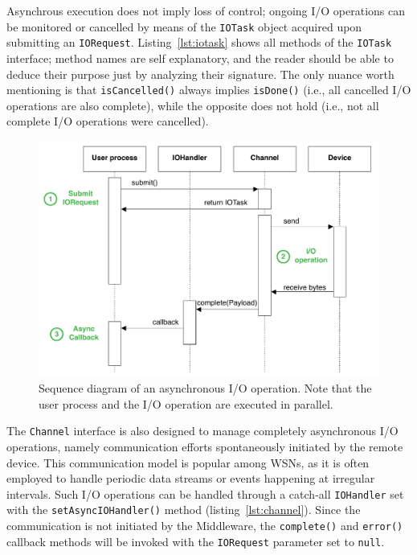 Asynchrous execution does not imply loss of control; ongoing I/O operations can
be monitored or cancelled by means of the \texttt{IOTask} object acquired upon
submitting an \texttt{IORequest}. Listing~\ref{lst:iotask} shows all methods of
the \texttt{IOTask} interface; method names are self explanatory, and the
reader should be able to deduce their purpose just by analyzing their 
signature. The only nuance worth mentioning is that
\texttt{isCancelled()} always implies \texttt{isDone()} (i.e., all cancelled
I/O operations are also complete), while the opposite does not hold (i.e., not
all complete I/O operations were cancelled).

\begin{figure}[!hbt]
\includegraphics[width=\textwidth]{imgs/async_channel_sequence.pdf}
\caption{Sequence diagram of an asynchronous I/O operation. Note that the user
process and the I/O operation are executed in parallel.}
\label{fig:channel.async}
\end{figure}

The \texttt{Channel} interface is also designed to manage completely
asynchronous I/O operations, namely communication efforts spontaneously
initiated by the remote device. This communication model is popular among WSNs,
as it is often employed to handle periodic data streams or events happening
at irregular intervals. Such I/O operations can be handled through a catch-all
\texttt{IOHandler} set with the \texttt{setAsyncIOHandler()} method
(listing~\ref{lst:channel}). Since the communication is not initiated by the
Middleware, the \texttt{complete()} and \texttt{error()} callback methods will
be invoked with the \texttt{IORequest} parameter set to \texttt{null}.


